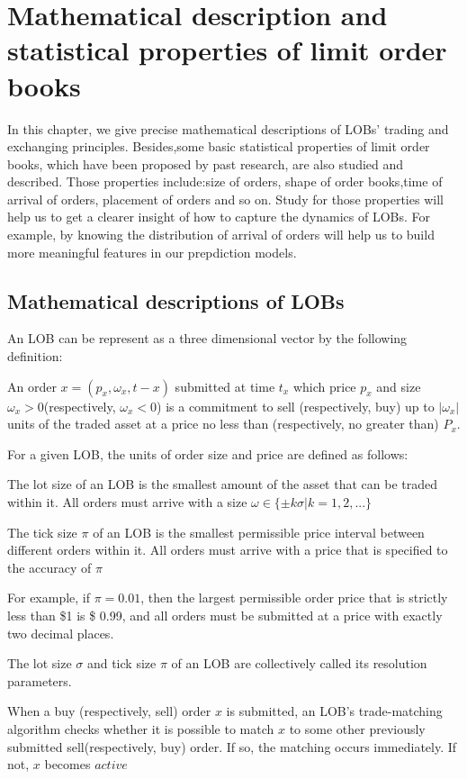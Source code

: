 \chapter{Mathematical description and statistical properties of limit order books  }
In this chapter, we give precise mathematical descriptions of LOBs' trading and exchanging principles. 
Besides,some basic statistical properties of limit order books, which have been proposed by past research, are also studied and described. Those properties include:size of orders, shape of order books,time of arrival of orders, placement of orders and so on. Study for those properties will help us to get a clearer insight of how to capture the dynamics of LOBs. For example, by knowing the distribution of arrival of orders will help us to build more meaningful features in our prepdiction models. 
  
\section{Mathematical descriptions of LOBs}
An LOB can be represent as a three dimensional vector by the following definition:
\begin{defn}
An order $x=(p_x, \omega_x,t-x)$ submitted at time $t_x$ which price $p_x$ and size $\omega_x>0$(respectively, $\omega_x<0$) is a commitment to sell (respectively, buy) up to $|\omega_x|$ units of the traded asset at a price no less than (respectively, no greater than) $P_x$.
\end{defn}

For a given LOB, the units of order size and price are defined as follows:
\begin{defn}
The lot size of an LOB is the smallest amount of the asset that can be traded within it. All orders must arrive with a size $\omega \in \{\pm k\sigma|k=1,2,...\}$
\end{defn}

\begin{defn}
The tick size $\pi$ of an LOB is the smallest permissible price interval between different orders within it. All orders must arrive with a price that is specified to the accuracy of $\pi$
\end{defn}

For example, if $\pi=0.01$, then the largest permissible order price that is strictly less than \$1 is \$ 0.99, and all orders must be submitted at a price with exactly two decimal places.
\begin{defn}
The lot size $\sigma$ and tick size $\pi$ of an LOB are collectively called its resolution parameters.
\end{defn} 
\begin{defn}
When a buy (respectively, sell) order $x$ is submitted, an LOB's trade-matching algorithm checks whether it is possible to match $x$ to some other previously submitted sell(respectively, buy) order. If so, the matching occurs immediately. If not, $x$ becomes $active$
\end{defn}

